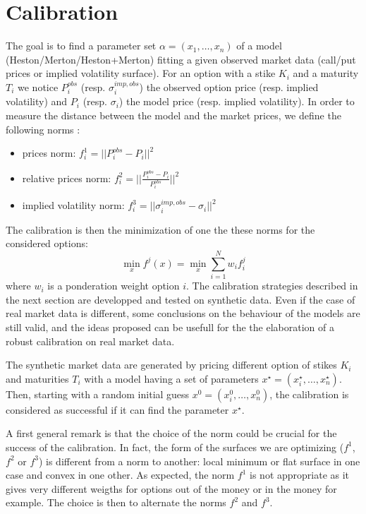 \documentclass[12pt,a4paper]{article}
\def\dps{\displaystyle}
\begin{document}
\section{Calibration}
%
The goal is to find a parameter set $\alpha =(x_1,\dots,x_n)$ of a
model (Heston/Merton/Heston+Merton) fitting a given observed market
data (call/put prices or implied volatility surface). For an option
with a stike $K_i$ and a maturity $T_i$ we notice $P_i^{obs}$
(resp. $\sigma_i^{imp,obs}$) the observed option price (resp. implied
volatility) and $P_i$ (resp. $\sigma_i$) the model price (resp.
implied volatility). 
In order to measure the distance between the model and the market
prices, we define the following norms :
\begin{itemize}
\item prices norm: $\dps f^1_i = ||P_i^{obs} - P_i ||^2$
\item relative prices norm: $\dps f^2_i = ||\frac{P_i^{obs} - P_i}{P_i^{obs}}||^2$
\item implied volatility norm:  $\dps f^3_i = ||\sigma_i^{imp,obs} - \sigma_i||^2$
\end{itemize}  
%
The calibration is then the minimization of one the these norms for
the considered options: 
\[
\min_{x} f^j(x) = \min_{x} \sum_{i=1}^{N} w_i f^j_i
\]
where $w_i$ is a ponderation weight option $i$. 
%
The calibration strategies described in the next section are
developped and tested on synthetic data. Even if the case of real
market data is different, some conclusions on the behaviour of the
models are still valid, and the ideas proposed can be usefull for the
the elaboration of a robust calibration on real market data.

The synthetic market data are generated by pricing different option
of stikes $K_i$ and maturities $T_i$ with a model having a set of
parameters $x^\star = (x^\star_i,\dots,x^\star_n)$.  Then, starting 
with a random initial guess $x^0 = (x^0_i,\dots,x^0_n)$, the
calibration is considered as successful if it can find the parameter
$x^\star$. 

A first general remark is that the choice of the norm could be crucial
for the success of the calibration. In fact, the form of the surfaces we
are optimizing ($f^1$, $f^2$ or $f^3$) is different from a norm to
another: local minimum or flat surface in one case and convex in one
other. As expected, the norm $f^1$ is not appropriate as it gives very
different weigths for options out of the money or in the money for
example. The choice is then to alternate the norms $f^2$ and $f^3$. 
\end{document}
